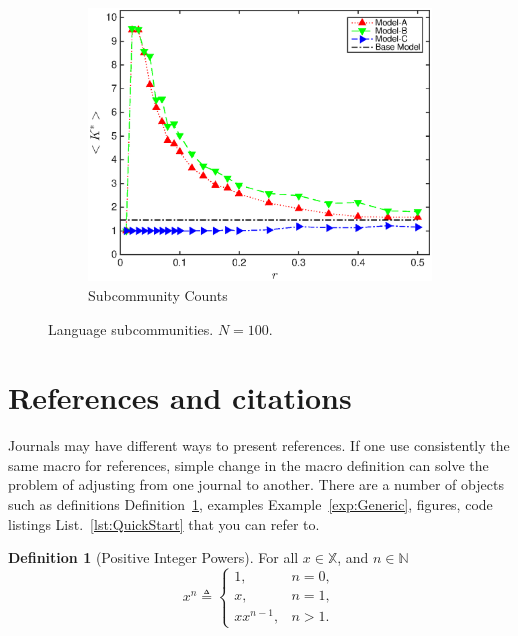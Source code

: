 \documentclass[pre,twocolumn,showkeys,longbibliography]{revtex4-1}
\newcommand{\reflst}[1]{List.~\ref{#1}}  %
\newcommand{\refdef}[1]{Definition~\ref{#1}}
\newcommand{\refexmp}[1]{Example~\ref{#1}}
\theoremstyle{plain}%
\theoremstyle{definition}
\newtheorem{defn}{Definition}[section]
\theoremstyle{remark}
\newcommand{\hSoX}{\mathbb{X}} %
\newcommand{\hSoN}{\mathbb{N}} %
\begin{document}
\begin{figure}[!tbp]
\begin{subfigure}{\columnwidth}
		\includegraphics[width=\columnwidth]
			{FigKStar100.eps}
		\caption{Subcommunity Counts} 
		\label{fig:FigKStar100}
	\end{subfigure}
	\caption{
		Language subcommunities.
		$N = 100$.
	} %
	\label{fig:N100}
\end{figure}






\section{References and citations}
\label{sec:ReferencesAndCitations}

Journals may have different ways to present references. 
If one use consistently the same macro for references,
simple change in the macro definition can solve 
the problem of adjusting from one journal to another.
There are a number of objects such as 
definitions \refdef{def:PositiveIntegerPowers}, 
examples \refexmp{exp:Generic},
figures, 
code listings \reflst{lst:QuickStart}
 that you can refer to.

\begin{defn}[Positive Integer Powers]
	For all $x \in \hSoX$, and $n \in \hSoN$
	\[
		x^{n} \triangleq
		\begin{cases}
			1, 
			 &n = 0, \\
			x, 
			 &n = 1, \\
			x x^{n-1},
			 &n > 1.
		\end{cases}
	\]
	\label{def:PositiveIntegerPowers}
\end{defn}
\end{document}
